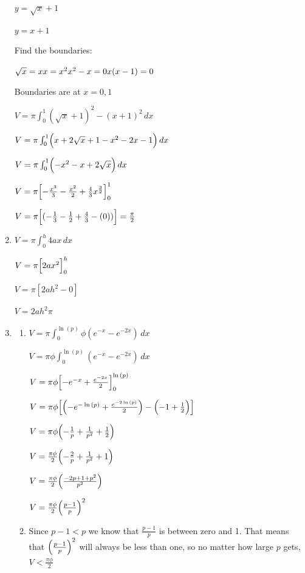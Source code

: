 \documentclass[../main.tex]{subfiles}
\begin{document}
\begin{spacing}{1.5}
\begin{enumerate}[itemsep=0.7cm]
    $y=\sqrt{x}+1$

    $y=x+1$

    Find the boundaries:

    $\sqrt{x}=x\\
    x=x^2\\
    x^2-x=0\\
    x(x-1)=0$

    Boundaries are at $x=0, 1$

    $V=\pi \int_0^1 (\sqrt{x}+1)^2-(x+1)^2\,dx$

    $V=\pi \int_0^1 \Bigl(x+2\sqrt{x}+1-x^2-2x-1\Bigr)\,dx$

    $V=\pi \int_0^1 \Bigl(-x^2 -x+2\sqrt{x}\Bigr)\,dx$

    $V=\pi \Bigl[-\frac{x^3}{3}-\frac{x^2}{2}+\frac{4}{3}x^{\frac{3}{2}}\Bigr]_0^1$

    $V=\pi \Bigl[(-\frac{1}{3}-\frac{1}{2}+\frac{4}{3}-(0))\Bigr]=\frac{\pi}{2}$

    \item 
    $V=\pi \int_0^h 4ax\,dx$

    $V=\pi \Bigl[2ax^2\Bigr]_0^h$

    $V=\pi [2ah^2 - 0]$

    $V=2ah^2\pi$

    \item 
    \begin{enumerate}
        \item 
        $V=\pi \int_0^{\ln{(p)}} \phi(e^{-x}-e^{-2x})\,dx$
    
        $V=\pi \phi\int_0^{\ln{(p)}} (e^{-x}-e^{-2x})\,dx$
    
        $V=\pi \phi \Bigl[-e^{-x}+\frac{e^{-2x}}{2}\Bigr]_0^{\ln{(p)}}$

        $V=\pi \phi \Bigl[\Bigl(-e^{-\ln{(p)}}+\frac{e^{-2\ln{(p)}}}{2}\Bigr)-\Bigl(-1+\frac{1}{2}\Bigr)\Bigr]$

        $V=\pi \phi \Bigl(-\frac{1}{p}+\frac{1}{p^2}+\frac{1}{2}\Bigr)$

        $V=\frac{\pi \phi}{2}\Bigl(-\frac{2}{p}+\frac{1}{p^2}+1\Bigr)$

        $V=\frac{\pi \phi}{2}\Bigl(\frac{-2p+1+p^2}{p^2}\Bigr)$

        $V=\frac{\pi \phi}{2}\Bigl(\frac{p-1}{p}\Bigr)^2$
    
        \item Since $p-1<p$ we know that $\frac{p-1}{p}$ is between zero and 1. That means that $\Bigl(\frac{p-1}{p}\Bigr)^2$ will always be less than one, so no matter how large $p$ gets, $V<\frac{\pi \phi}{2}$
    

\end{enumerate}
\end{enumerate}
\end{spacing}
\end{document}
